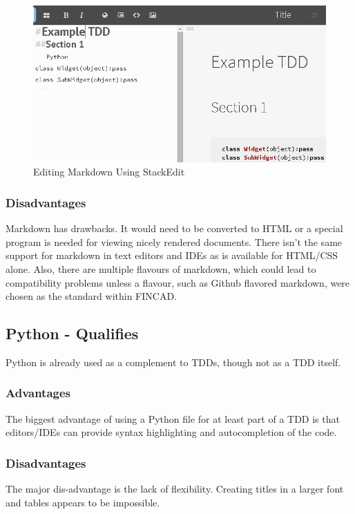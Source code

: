 \documentclass[]{article}
\begin{document}
	\begin{figure}[h]
		\centering
		\includegraphics[scale=.5]{StackEdit.png}
		\caption{Editing Markdown Using StackEdit}
		\label{StackEdit}
	\end{figure}
	
	\subsubsection{Disadvantages}
	Markdown has drawbacks. It would need to be converted to HTML or a special program is needed for viewing nicely rendered documents.  There isn't the same support for markdown in text editors and IDEs as is available for HTML/CSS alone.  Also, there are multiple flavours of markdown, which could lead to compatibility problems unless a flavour, such as Github flavored markdown, were chosen as the standard within FINCAD.


\subsection{Python - Qualifies}
	Python is already used as a complement to TDDs, though not as a TDD itself.
	\subsubsection{Advantages}
	The biggest advantage of using a Python file for at least part of a TDD is that editors/IDEs can provide syntax highlighting and autocompletion of the code.
	
	\subsubsection{Disadvantages}
	The major dis-advantage is the lack of flexibility.  Creating titles in a larger font and tables appears to be impossible.
\end{document}
